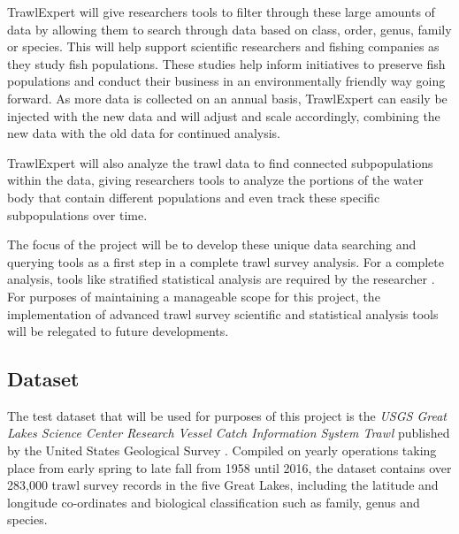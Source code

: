 \documentclass{article}
\begin{document}
TrawlExpert will give researchers tools to filter through these large amounts of data by allowing them to search through data based on class, order, genus, family or species. This will help support scientific researchers and fishing companies as they study fish populations. These studies help inform initiatives to preserve fish populations and conduct their business in an environmentally friendly way going forward. As more data is collected on an annual basis, TrawlExpert can easily be injected with the new data and will adjust and scale accordingly, combining the new data with the old data for continued analysis.

TrawlExpert will also analyze the trawl data to find connected subpopulations within the data, giving researchers tools to analyze the portions of the water body that contain different populations and even track these specific subpopulations over time.

The focus of the project will be to develop these unique data searching and querying tools as a first step in a complete trawl survey analysis. For a complete analysis, tools like stratified statistical analysis are required by the researcher \citep{walsh1997efficiency}. For purposes of maintaining a manageable scope for this project, the implementation of advanced trawl survey scientific and statistical analysis tools will be relegated to future developments. 

\subsection{Dataset}\label{sec:out}
The test dataset that will be used for purposes of this project is the \textit{USGS Great Lakes Science Center Research Vessel Catch Information System Trawl} published by the United States Geological Survey \citep{usgs2018}. Compiled on yearly operations taking place from early spring to late fall from 1958 until 2016, the dataset contains over 283,000 trawl survey records in the five Great Lakes, including the latitude and longitude co-ordinates and biological classification such as family, genus and species.
\end{document}
